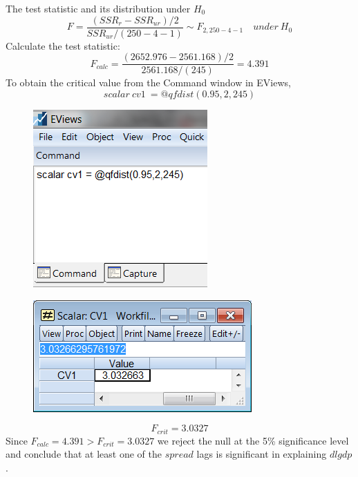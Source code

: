 \documentclass[12pt]{report}
\begin{document}
\vspace{-\baselineskip}
\noindent The test statistic and its distribution under $H_0$
$$F = \dfrac{(SSR_r - SSR_{ur})/2}{SSR_{ur}/(250-4-1)} {\sim} F_{2,250-4-1} \quad under\ H_0$$
\noindent Calculate the test statistic:
$$F_{calc} = \dfrac{(2652.976 - 2561.168)/2}{2561.168/(245)} = 4.391$$
\noindent To obtain the critical value from the Command window in EViews,
$$scalar\ cv1\ = @qfdist(0.95,2,245)$$
\begin{figure}[H]
	\centerline{\includegraphics{tute11_44}}
\end{figure}
\vspace{-\baselineskip}
\begin{figure}[H]
	\centerline{\includegraphics{tute11_45}}
\end{figure}
\vspace{-\baselineskip}
$$F_{crit} =  3.0327$$
\noindent Since $F_{calc} = 4.391 > F_{crit} = 3.0327$ we reject the null at the 5\% significance level and conclude that at least one of the $spread$ lags is significant in explaining $dlgdp$.
\end{document}
